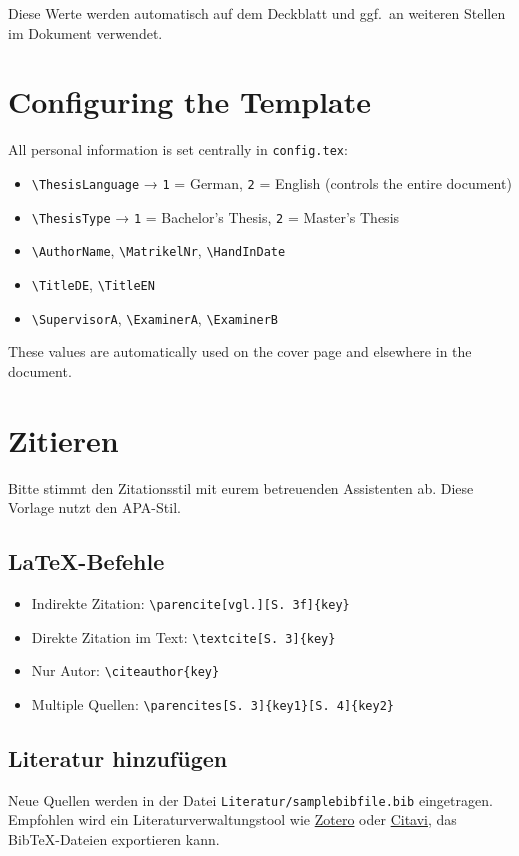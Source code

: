   Diese Werte werden automatisch auf dem Deckblatt und ggf.\ an weiteren Stellen im Dokument verwendet.

\else
  \section{Configuring the Template}
  All personal information is set centrally in \texttt{config.tex}:
  \begin{itemize}
    \item \verb|\ThesisLanguage| → \texttt{1} = German, \texttt{2} = English (controls the entire document)
    \item \verb|\ThesisType| → \texttt{1} = Bachelor's Thesis, \texttt{2} = Master's Thesis
    \item \verb|\AuthorName|, \verb|\MatrikelNr|, \verb|\HandInDate|
    \item \verb|\TitleDE|, \verb|\TitleEN|
    \item \verb|\SupervisorA|, \verb|\ExaminerA|, \verb|\ExaminerB|
  \end{itemize}

  These values are automatically used on the cover page and elsewhere in the document.
\fi


\ifnum{}
  \section{Zitieren}
  Bitte stimmt den Zitationsstil mit eurem betreuenden Assistenten ab. Diese Vorlage nutzt den APA-Stil.
  \subsection{LaTeX-Befehle}
  \begin{itemize}
    \item Indirekte Zitation: \verb|\parencite[vgl.][S. 3f]{key}|
    \item Direkte Zitation im Text: \verb|\textcite[S. 3]{key}|
    \item Nur Autor: \verb|\citeauthor{key}|
    \item Multiple Quellen: \verb|\parencites[S. 3]{key1}[S. 4]{key2}|
  \end{itemize}

  \subsection{Literatur hinzufügen}
  Neue Quellen werden in der Datei \texttt{Literatur/samplebibfile.bib} eingetragen. Empfohlen wird ein Literaturverwaltungstool wie \href{https://www.zotero.org/}{Zotero} oder \href{https://www.citavi.com/}{Citavi}, das BibTeX-Dateien exportieren kann.

